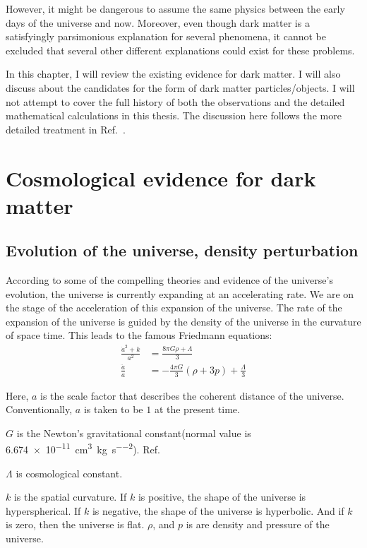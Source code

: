 However, it might be dangerous to assume the same physics between the early days of the universe and now. Moreover, even though dark matter is a satisfyingly parsimonious explanation for several phenomena, it cannot be excluded that several other different explanations could exist for these problems. 

In this chapter, I will review the existing evidence for dark matter. I will also discuss about the candidates for the form of dark matter particles/objects. I will not attempt to cover the full history of both the observations and the detailed mathematical calculations in this thesis. The discussion here follows the more detailed treatment in Ref.~\cite{Bertone2005,Roos2010,Dodelson2003}. 

\section{Cosmological evidence for dark matter}
 \subsection{Evolution of the universe, density perturbation}
 According to some of the compelling theories and evidence of the  universe's evolution, the universe is currently expanding at an accelerating rate. We are on the stage of the acceleration of this expansion of the universe. The rate of the expansion of the universe is guided by the density of the universe in the curvature of space time. This leads to the famous Friedmann equations: 
\begin{align}
\label{freidmann}
\frac{\dot{a}^2+k}{a^2} &= \frac{8 \pi G \rho+ \Lambda}{3} \\
\frac{\ddot{a}}{a} &= -\frac{4 \pi G} {3}(\rho+3 p) + \frac{\Lambda}{3}
\end{align}  

Here, $a$ is the scale factor that describes the coherent distance of the universe. Conventionally, $a$ is taken to be $1$ at the present time.

$G$ is the Newton's gravitational constant(normal value is \SI{6.674e-11}{\cm\cubed\per\kg\per\second\squared}). Ref.~\cite{NIST}

$\Lambda$ is cosmological constant.

$k$ is the spatial curvature. If $k$ is positive, the shape of the universe is hyperspherical. If $k$ is negative, the shape of the universe is hyperbolic. And if $k$ is zero, then the universe is flat.
$\rho$, and $p$ is are density and pressure of the universe.

